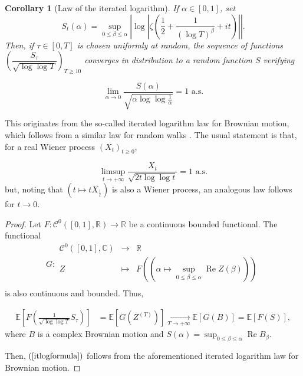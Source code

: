 \documentclass{article}
\newcommand{\ds}{\displaystyle}
\DeclareMathOperator{\Rea}{Re}
\newcommand{\1}{\mathds{1}}
\numberwithin{equation}{section}
\renewcommand{\leq}{\leqslant}
\renewcommand{\geq}{\geqslant}
\newcommand{\E}{\mathbb{E}}
\newcommand{\R}{\mathbb{R}}
\newcommand{\C}{\mathbb{C}}
\theoremstyle{plain} %
\newtheorem{corollary}[theorem]{Corollary}
\newcommand{\hf}{\frac{1}{2}}
\begin{document}
\begin{corollary}[Law of the iterated logarithm]
    If $\alpha \in [0,1]$, set
    \begin{equation}
        S_t(\alpha) = \sup_{0 \leq \beta \leq \alpha} \left|\log |\zeta(\hf + \frac{1}{(\log T)^{\beta}} + i t)|\right|.
    \end{equation}
    Then, if $\tau \in [0, T]$ is chosen uniformly at random, the sequence of functions $\left(\dfrac{S_{\tau}}{\sqrt{\log \log T}}\right)_{T \geq 10}$ converges in distribution to a random function $S$ verifying 

    \begin{equation} \label{itlogformula}
        \lim_{\alpha \to 0} \frac{S(\alpha)}{\sqrt{\alpha \log \log \frac{1}{\alpha}}} = 1 \text{ a.s.}
    \end{equation}

\end{corollary}

This originates from the so-called iterated logarithm law for Brownian motion, which follows from a similar law for random walks \cite{itlog}. The usual statement is that, for a real Wiener process $(X_t)_{t \geq 0}$,

\begin{equation}
    \limsup_{t \to + \infty} \frac{X_t}{\sqrt{2t \log \log t}} = 1 \text{ a.s.}
\end{equation}
but, noting that $(t \mapsto t X_{\frac{1}{t}})$ is also a Wiener process, an analogous law follows for $t \to 0$.

\begin{proof}
    Let $F: \mathcal{C}^0([0,1], \R) \to \R$ be a continuous bounded functional. The functional
    \begin{displaymath}
G:
\left.
  \begin{array}{rcl}
    \mathcal{C}^0([0,1], \C) & \longrightarrow &\R \\
    Z & \longmapsto & F\left(\left( \alpha \mapsto \ds\sup_{0 \leq \beta \leq \alpha} \Rea  Z(\beta)\right)\right)\\
  \end{array}
\right.
\end{displaymath}
is also continuous and bounded. Thus,

\begin{equation}
    \begin{split}
        \E\left[F \left(\frac{1}{\sqrt{\log \log T}}S_{\tau}\right)\right] & = \E[G(Z^{(T)})] \underset{T \to +\infty}{\longrightarrow} \E[G(B)] = \E[F(S)],
    \end{split}
\end{equation}
where $B$ is a complex Brownian motion and $S(\alpha) = \ds\sup_{0\leq \beta \leq \alpha}\Rea B_\beta$.

Then, $(\ref{itlogformula})$ follows from the aforementioned iterated logarithm law for Brownian motion.
\end{proof}
\end{document}
